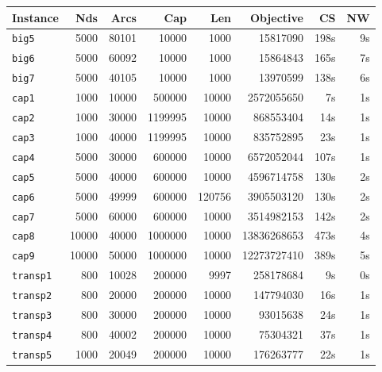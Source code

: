 \documentclass[a4paper,11pt,twoside]{book}
\begin{document}
\begin{multicols}{2}
\bigskip
\begin{center}
\small
\begin{tabular}{|lrrrrrrr|}
\hline
{\bf Instance} & {\bf Nds} & {\bf Arcs} & {\bf Cap} & {\bf Len} & {\bf Objective} & {\bf CS} & {\bf NW} \\
\hline
\hline
\verb/big5/    &    5000 &   80101 &    10000 &     1000 &       15817090 &      198s &    9s \\
\verb/big6/    &    5000 &   60092 &    10000 &     1000 &       15864843 &      165s &    7s \\
\verb/big7/    &    5000 &   40105 &    10000 &     1000 &       13970599 &      138s &    6s \\
\verb/cap1/    &    1000 &   10000 &   500000 &    10000 &     2572055650 &        7s &    1s \\
\verb/cap2/    &    1000 &   30000 &  1199995 &    10000 &      868553404 &       14s &    1s \\
\verb/cap3/    &    1000 &   40000 &  1199995 &    10000 &      835752895 &       23s &    1s \\
\verb/cap4/    &    5000 &   30000 &   600000 &    10000 &     6572052044 &      107s &    1s \\
\verb/cap5/    &    5000 &   40000 &   600000 &    10000 &     4596714758 &      130s &    2s \\
\verb/cap6/    &    5000 &   49999 &   600000 &   120756 &     3905503120 &      130s &    2s \\
\verb/cap7/    &    5000 &   60000 &   600000 &    10000 &     3514982153 &      142s &    2s \\
\verb/cap8/    &   10000 &   40000 &  1000000 &    10000 &    13836268653 &      473s &    4s \\
\verb/cap9/    &   10000 &   50000 &  1000000 &    10000 &    12273727410 &      389s &    5s \\
\verb/transp1/ &     800 &   10028 &   200000 &     9997 &      258178684 &        9s &    0s \\
\verb/transp2/ &     800 &   20000 &   200000 &    10000 &      147794030 &       16s &    1s \\
\verb/transp3/ &     800 &   30000 &   200000 &    10000 &       93015638 &       24s &    1s \\
\verb/transp4/ &     800 &   40002 &   200000 &    10000 &       75304321 &       37s &    1s \\
\verb/transp5/ &    1000 &   20049 &   200000 &    10000 &      176263777 &       22s &    1s \\

\end{tabular}
\end{center}
\end{multicols}
\end{document}
